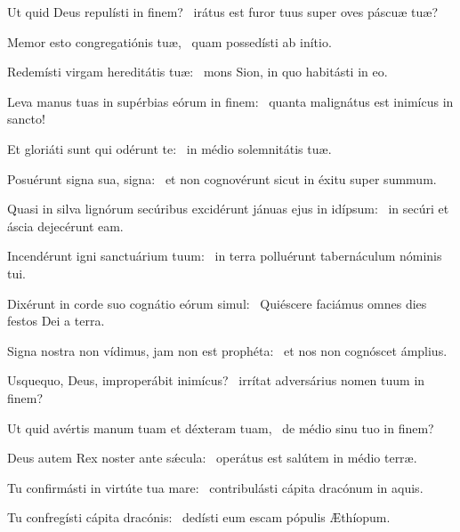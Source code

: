 \item Ut quid Deus repulísti in finem?~\psstar{} irátus est furor tuus super oves páscuæ tuæ?

\item Memor esto congregatiónis tuæ,~\psstar{} quam possedísti ab inítio.

\item Redemísti virgam hereditátis tuæ:~\psstar{} mons Sion, in quo habitásti in eo.

\item Leva manus tuas in supérbias eórum in finem:~\psstar{} quanta malignátus est inimícus in sancto!

\item Et gloriáti sunt qui odérunt te:~\psstar{} in médio solemnitátis tuæ.

\item Posuérunt signa sua, signa:~\psstar{} et non cognovérunt sicut in éxitu super summum.

\item Quasi in silva lignórum secúribus excidérunt jánuas ejus in idípsum:~\psstar{} in secúri et áscia dejecérunt eam.

\item Incendérunt igni sanctuárium tuum:~\psstar{} in terra polluérunt tabernáculum nóminis tui.

\item Dixérunt in corde suo cognátio eórum simul:~\psstar{} Quiéscere faciámus omnes dies festos Dei a terra.

\item Signa nostra non vídimus, jam non est prophéta:~\psstar{} et nos non cognóscet ámplius.

\item Usquequo, Deus, improperábit inimícus?~\psstar{} irrítat adversárius nomen tuum in finem?

\item Ut quid avértis manum tuam et déxteram tuam,~\psstar{} de médio sinu tuo in finem?

\item Deus autem Rex noster ante sǽcula:~\psstar{} operátus est salútem in médio terræ.

\item Tu confirmásti in virtúte tua mare:~\psstar{} contribulásti cápita dracónum in aquis.

\item Tu confregísti cápita dracónis:~\psstar{} dedísti eum escam pópulis Æthíopum.

